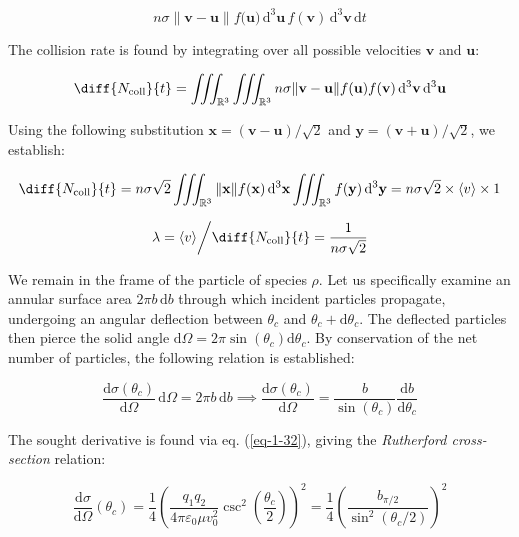 \begin{equation}
    n\sigma\|\mathbf{v}-\mathbf{u}\|f(\mathbf{u)}\,\mathrm{d}^3\mathbf{u}\,f(\mathbf{v})\,\mathrm{d}^3\mathbf{v}\,\mathrm{d}t
\end{equation}

The collision rate is found by integrating over all possible velocities $\mathbf{v}$ and $\mathbf{u}$:

\begin{equation}
    \diff{N_\text{coll}}{t}=\iiint_{\mathbb{R}^3}\iiint_{\mathbb{R}^3}n\sigma\|\mathbf{v}-\mathbf{u}\|f(\mathbf{u)}f(\mathbf{v})\,\mathrm{d}^3\mathbf{v}\,\mathrm{d}^3\mathbf{u}
\end{equation}

Using the following substitution $\mathbf{x}=(\mathbf{v-u})/\sqrt{2}$ and $\mathbf{y}=(\mathbf{v}+\mathbf{u})/\sqrt{2}$, we establish:

\begin{equation}
    \label{eq1-41}
    \diff{N_\text{coll}}{t}=n\sigma\sqrt{2}\iiint_{\mathbb{R}^3}\|\mathbf{x}\|f(\mathbf{x})\,\mathrm{d}^3\mathbf{x}\iiint_{\mathbb{R}^3}f(\mathbf{y})\,\mathrm{d}^3\mathbf{y}=n\sigma\sqrt{2}\times\langle v\rangle\times1
\end{equation}

\begin{equation}
    \lambda=\langle v\rangle\bigg/\diff{N_\text{coll}}{t}=\frac{1}{n\sigma\sqrt{2}}
\end{equation}

We remain in the frame of the particle of species $\rho$. Let us specifically examine an annular surface area $2\pi b\,\mathrm{d}b$ through which incident particles propagate, undergoing an angular deflection between $\theta_c$ and $\theta_c+\mathrm{d}\theta_c$. The deflected particles then pierce the solid angle $\mathrm{d}\Omega=2\pi\sin(\theta_c)\mathrm{d}\theta_c$. By conservation of the net number of particles, the following relation is established:

\begin{equation}
    \frac{\mathrm{d}\sigma(\theta_c)}{\mathrm{d}\Omega}\,\mathrm{d}\Omega=2\pi b\,\mathrm{d}b\implies\frac{\mathrm{d}\sigma(\theta_c)}{\mathrm{d}\Omega}=\frac{b}{\sin(\theta_c)}\frac{\mathrm{d}b}{\mathrm{d}\theta_c}
\end{equation}

The sought derivative is found via eq. (\ref{eq-1-32}), giving the \textit{Rutherford cross-section} relation:

\begin{equation}
    \frac{\mathrm{d}\sigma}{\mathrm{d}\Omega}(\theta_c)=\frac{1}{4}\left(\frac{q_1q_2}{4\pi\varepsilon_0\mu v_0^2}\csc^2\left(\frac{\theta_c}{2}\right)\right)^2=\frac{1}{4}\left(\frac{b_{\pi/2}}{\sin^2(\theta_c/2)}\right)^2
\end{equation}

